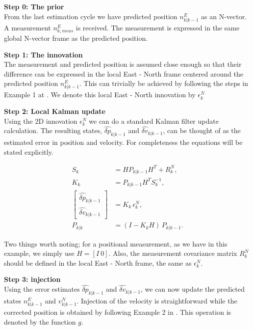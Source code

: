 \textbf{Step 0: The prior} \\
From the last estimation cycle we have predicted position $n^E_{k \vert k-1}$ as an N-vector. A measurement $n^E_{k, meas}$ is received. The measurement is expressed in the same global N-vector frame as the predicted position.

\textbf{Step 1: The innovation} \\
The measurement and predicted position is assumed close enough so that their difference can be expressed in the local East - North frame centered around the predicted position $n^E_{k \vert k-1}$. This can trivially be achieved by following the steps in Example 1 at \parencite{ffi_nvector}. We denote this local East - North innovation by $\epsilon^N_k$

\textbf{Step 2: Local Kalman update} \\
Using the 2D innovation $\epsilon^N_k$ we can do a standard Kalman filter update calculation. The resulting states, $\widehat{\delta p}_{k \vert k-1}$ and $\widehat{\delta v}_{k \vert k-1}$, can be thought of as the estimated error in position and velocity. For completeness the equations will be stated explicitly. 

\begin{align}
S_k &= H P_{k|k-1} H^T + R^N_k, \\[4pt]
K_k &= P_{k|k-1} H^T S_k^{-1}, \\[4pt]
\begin{bmatrix}
\widehat{\delta p}_{k|k-1} \\
\widehat{\delta v}_{k|k-1}
\end{bmatrix}
&= K_k\, \epsilon^N_k, \\[4pt]
P_{k|k} &= (I - K_k H)\, P_{k|k-1}.
\end{align}

Two things worth noting; for a positional measurement, as we have in this example, we simply use $H = [I \: 0]$. Also, the measurement covariance matrix $R^N_k$ should be defined in the local East - North frame, the same as $\epsilon^N_k$.

\textbf{Step 3: injection} \\
Using the error estimates $\widehat{\delta p}_{k \vert k-1}$ and $\widehat{\delta v}_{k \vert k-1}$, we can now update the predicted states $n^E_{k \vert k-1}$ and $v^N_{k \vert k-1}$. Injection of the velocity is straightforward while the corrected position is obtained by following Example 2 in \parencite{ffi_nvector}. This operation is denoted by the function $g$.

